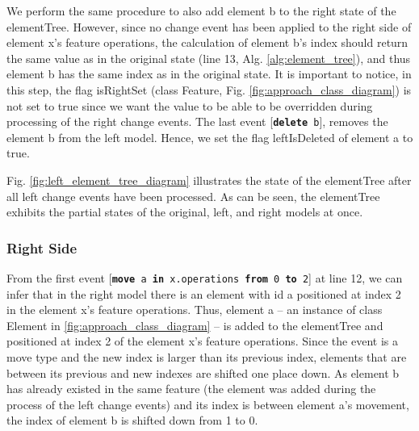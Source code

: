 \documentclass{jot}
\begin{document}
    We perform the same procedure to also add element \textsf{b} to the right state of the \textsf{elementTree}. However, since no change event has been applied to the right side of element \textsf{x}'s feature \textsf{operations}, the calculation of element \textsf{b}'s index should return the same value as in the original state (line 13, Alg. \ref{alg:element_tree}), and thus element \textsf{b} has the same index as in the original state. It is important to notice, in this step, the flag \textsf{isRightSet} (class \textsf{Feature}, Fig. \ref{fig:approach_class_diagram}) is not set to \textsf{true} since we want the value to be able to be overridden during processing of the right change events. The last event [\texttt{\small \textbf{delete} b}], removes the element \textsf{b} from the left model. Hence, we set the flag \textsf{leftIsDeleted} of element \textsf{a} to \textsf{true}.
    
    Fig. \ref{fig:left_element_tree_diagram} illustrates the state of the \textsf{elementTree} after all left change events have been processed. As can be seen, the \textsf{elementTree} exhibits the partial states of the original, left, and right models at once. 
    
    \subsubsection{Right Side}\label{sec:right_side}  From the first event [\texttt{\small \textbf{move} a \textbf{in} x.operations \textbf{from} 0 \textbf{to} 2}] at line 12, we can infer that in the right model there is an element with id \textsf{a} positioned at index 2 in the element \textsf{x}'s feature \textsf{operations}. Thus, element \textsf{a} -- an instance of class \textsf{Element} in \ref{fig:approach_class_diagram} -- is added to the \textsf{elementTree} and positioned at index 2 of the element \textsf{x}'s feature \textsf{operations}. Since the event is a \textsf{move} type and the new index is larger than its previous index, elements that are between its previous and new indexes are shifted one place down. As element \textsf{b} has already existed in the same feature (the element was added during the process of the left change events) and its index is between element \textsf{a}'s movement, the index of element \textsf{b} is shifted down from 1 to 0. 
    
\end{document}
